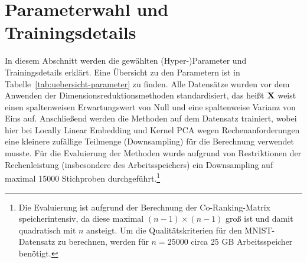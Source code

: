 \section{Parameterwahl und Trainingsdetails}
\label{ch:Vergleich:sec:ParameterwahlTrainingsdetails}

In diesem Abschnitt werden die gewählten (Hyper-)Parameter und Trainingsdetails erklärt. Eine
Übersicht zu den Parametern ist in Tabelle~\ref{tab:uebersicht-parameter} zu finden. Alle
Datensätze wurden vor dem Anwenden der Dimensionsreduktionsmethoden standardisiert, das heißt
$\mathbf{X}$ weist einen spaltenweisen Erwartungswert von Null und eine spaltenweise Varianz von Eins
auf. Anschließend werden die Methoden auf dem Datensatz trainiert, wobei hier bei Locally Linear
Embedding und Kernel PCA wegen Rechenanforderungen eine kleinere zufällige Teilmenge (Downsampling)
für die Berechnung verwendet musste. Für die Evaluierung der Methoden wurde aufgrund von
Restriktionen der Rechenleistung (insbesondere des Arbeitsspeichers) ein Downsampling auf maximal
\num{15000} Stichproben durchgeführt.\footnote{Die Evaluierung ist aufgrund der Berechnung der
	Co-Ranking-Matrix speicherintensiv, da diese maximal $(n-1) \times (n-1)$ groß ist und damit
	quadratisch mit $n$ ansteigt. Um die Qualitätskriterien für den MNIST-Datensatz zu berechnen,
	werden für $n=\num{25000}$ circa 25 GB Arbeitsspeicher benötigt.}

